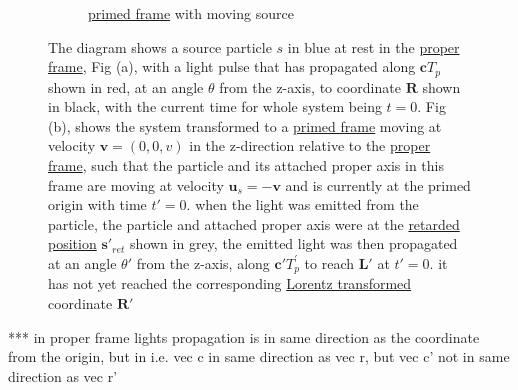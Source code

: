 \begin{figure}[H]
\begin{subfigure}{.49\textwidth}
		\caption{\hyperlink{def-Primed-Frame}{primed frame} with moving source}
		\label{fig: primed frame 1}
	\end{subfigure}
	\caption{The diagram shows a source particle $s$ in blue at rest in the \protect\hyperlink{def-proper-frame}{proper frame}, Fig (a), with a light pulse that has propagated along $\mathbf{c} T_{p}$ shown in red, at an angle $\theta$ from the z-axis, to coordinate $\mathbf{R}$ shown in black, with the current time for whole system being $t=0$.
	Fig (b), shows the system transformed to a \protect\hyperlink{def-Primed-Frame}{primed frame} moving at velocity $\mathbf{v}=(0,0,v)$ in the z-direction relative to the \protect\hyperlink{def-proper-frame}{proper frame}, such that the particle and its attached proper axis in this frame are moving at velocity $\mathbf{u}_s= - \mathbf{v}$ and is currently at the primed origin with time $t'=0$. when the light was emitted from the particle, the particle and attached proper axis were at the \protect\hyperlink{def-retarded-position}{retarded position}  $\mathbf{s}'_{ret}$ shown in grey, the emitted light was then propagated at an angle $\theta'$ from the z-axis, along $\mathbf{c}' T^{'}_{p}$ to reach $\mathbf{L}'$ at $t'=0$. it has not yet reached the corresponding \protect\hyperlink{def-lorentz-transform}{Lorentz transformed} coordinate $\mathbf{R}'$ }
	\label{fig: Retarded field outward field transform}
\end{figure}

*** in proper frame lights propagation is in same direction as the coordinate from the origin, but in i.e. vec c in same direction as vec r, but vec c' not in same direction as vec r'

